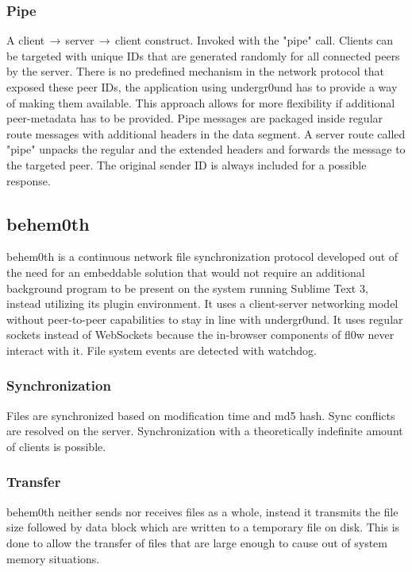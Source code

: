 \documentclass[conference]{IEEEtran}
\begin{document}
\subsubsection{Pipe}
A client$\,\to\,$server$\,\to\,$client construct. Invoked with the {\color{deepgreen}"pipe"} call. Clients can be targeted with unique IDs that are generated randomly for all connected peers by the server. There is no predefined mechanism in the network protocol that exposed these peer IDs, the application using undergr0und\cite{undergr0und:Philip Trauner} has to provide a way of making them available. This approach allows for more flexibility if additional peer-metadata has to be provided.
Pipe messages are packaged inside regular route messages with additional headers in the data segment. A server route called {\color{deepgreen}"pipe"} unpacks the regular and the extended headers and forwards the message to the targeted peer. The original sender ID is always included for a possible response.

\subsection{behem0th}
behem0th is a continuous network file synchronization protocol developed out of the need for an embeddable solution that would not require an additional background program to be present on the system running Sublime Text 3\cite{Sublime Text 3:Sublime HQ}, instead utilizing its plugin environment. It uses a client-server networking model without peer-to-peer capabilities to stay in line with undergr0und. It uses regular sockets instead of WebSockets\cite{The WebSocket Protocol:A. Melnikov} because the in-browser components of fl0w never interact with it. File system events are detected with watchdog\cite{watchdog:Yesudeep Mangalapilly}. 

\subsubsection{Synchronization}
Files are synchronized based on modification time and md5 hash. Sync conflicts are resolved on the server. Synchronization with a theoretically indefinite amount of clients is possible.

\subsubsection{Transfer}
behem0th neither sends nor receives files as a whole, instead it transmits the file size followed by data block which are written to a temporary file on disk. This is done to allow the transfer of files that are large enough to cause out of system memory situations.
\end{document}
